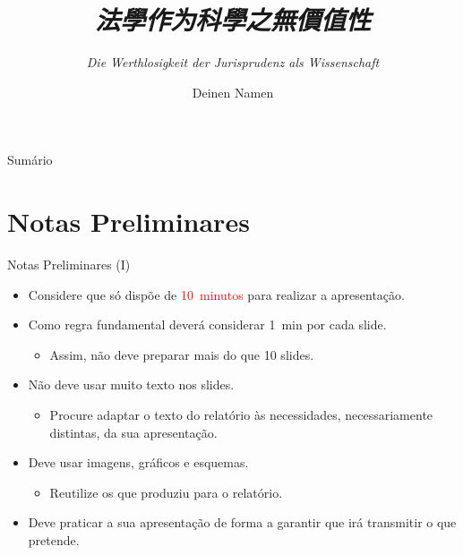 \documentclass[
aspectratio=169,	%
LETI,				%
english,			%
]{DEEclassP}
\title[法學作为科學之無價值性]{\textit{法學作为科學之無價值性}}
\subtitle{\textit{Die Werthlosigkeit der Jurisprudenz als Wissenschaft}\footfullcite{kirchmann1848werthlosigkeit}}
\author[Deinen Namen]{Deinen Namen}	%
\begin{document}
	\maketitlepage

\begin{frame}{Sumário}
	\tableofcontents
\end{frame}
\section{Notas Preliminares}

\begin{frame}{Notas Preliminares (I)}

\setlstep{0.3cm}{0cm}{0cm}	%
\begin{itemize}
	\item Considere que só dispõe de \textcolor{red}{10~minutos} para realizar a apresentação.
	\item Como regra fundamental deverá considerar 1~min por cada slide.
	\begin{itemize}
		\item Assim, não deve preparar mais do que 10 slides.
	\end{itemize}
	\item Não deve usar muito texto nos slides.
	\begin{itemize}
		\item Procure adaptar o texto do relatório às necessidades, necessariamente distintas, da sua apresentação.
	\end{itemize}	
	\item Deve usar imagens, gráficos e esquemas.
	\begin{itemize}
		\item Reutilize os que produziu para o relatório.
	\end{itemize}	
	\item Deve praticar a sua apresentação de forma a garantir que irá transmitir o que pretende.
\end{itemize}

\end{frame}
\end{document}
